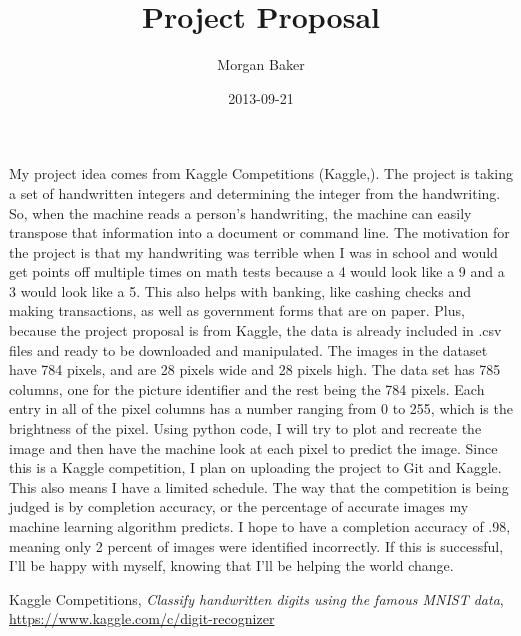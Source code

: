 \documentclass[a4paper]{article}
\title{Project Proposal}
\date{2013-09-21}
\author{Morgan Baker}
\begin{document}
\lstset{language=Python}
	
\maketitle

My project idea comes from Kaggle Competitions (Kaggle,\cite{citation01}). The project is taking a set of handwritten integers and determining the integer from the handwriting. So, when the machine reads a person’s handwriting, the machine can easily transpose that information into a document or command line. The motivation for the project is that my handwriting was terrible when I was in school and would get points off multiple times on math tests because a 4 would look like a 9 and a 3 would look like a 5. This also helps with banking, like cashing checks and making transactions, as well as government forms that are on paper. Plus, because the project proposal is from Kaggle, the data is already included in .csv files and ready to be downloaded and manipulated. The images in the dataset have 784 pixels, and are 28 pixels wide and 28 pixels high. The data set has 785 columns, one for the picture identifier and the rest being the 784 pixels. Each entry in all of the pixel columns has a number ranging from 0 to 255, which is the brightness of the pixel. Using python code, I will try to plot and recreate the image and then have the machine look at each pixel to predict the image. Since this is a Kaggle competition, I plan on uploading the project to Git and Kaggle. This also means I have a limited schedule. The way that the competition is being judged is by completion accuracy, or the percentage of accurate images my machine learning algorithm predicts. I hope to have a completion accuracy of .98, meaning only 2 percent of images were identified incorrectly. If this is successful, I’ll be happy with myself, knowing that I’ll be helping the world change. 

\begin{thebibliography}{9}

  Kaggle Competitions,
  \emph{Classify handwritten digits using the famous MNIST data},
   \url{https://www.kaggle.com/c/digit-recognizer}

\end{thebibliography}
\end{document}
